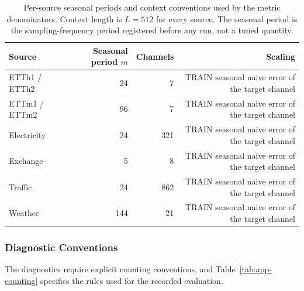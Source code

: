 \documentclass{article}
\begin{document}
\begin{table}[!t]
  \caption{Per-source seasonal periods and context conventions used by the metric
  denominators. Context length is $L = 512$ for every source. The seasonal period is the
  sampling-frequency period registered before any run, not a tuned quantity.}
  \label{tab:app-seasonality}
  \centering
  \small
  \setlength{\tabcolsep}{4pt}
\begin{tabular*}{\textwidth}{@{\extracolsep{\fill}}lrrr@{}}
    \toprule
    Source & Seasonal period $m$ & Channels & Scaling \\
    \midrule
    ETTh1 / ETTh2 & 24 & 7 & TRAIN seasonal naive error of the target channel \\
    ETTm1 / ETTm2 & 96 & 7 & TRAIN seasonal naive error of the target channel \\
    Electricity & 24 & 321 & TRAIN seasonal naive error of the target channel \\
    Exchange & 5 & 8 & TRAIN seasonal naive error of the target channel \\
    Traffic & 24 & 862 & TRAIN seasonal naive error of the target channel \\
    Weather & 144 & 21 & TRAIN seasonal naive error of the target channel \\
    \bottomrule
  \end{tabular*}
\end{table}

\subsubsection{Diagnostic Conventions}
\label{app:diagnostic-conventions}
The diagnostics require explicit counting conventions, and
Table~\ref{tab:app-counting} specifies the rules used for the recorded evaluation.
\end{document}
